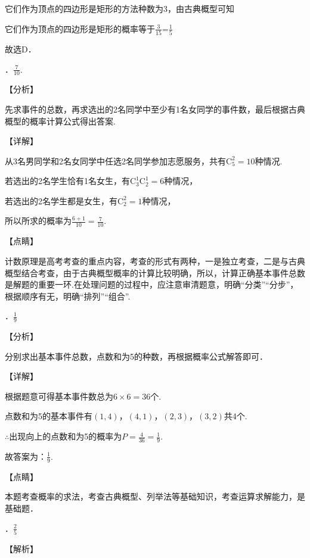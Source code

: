 \noindent 它们作为顶点的四边形是矩形的方法种数为3，由古典概型可知

\noindent 它们作为顶点的四边形是矩形的概率等于$\frac{3}{15} $=$\frac{1}{5} $

\noindent 故选D．

\noindent 

．$\frac{7}{10} $.

\noindent 【分析】

\noindent 先求事件的总数，再求选出的2名同学中至少有1名女同学的事件数，最后根据古典概型的概率计算公式得出答案.

\noindent 【详解】

\noindent 从3名男同学和2名女同学中任选2名同学参加志愿服务，共有$\mathrm C_{5}^{2} =10$种情况.

\noindent 若选出的2名学生恰有1名女生，有$\mathrm C_{3}^{1} \mathrm C_{2}^{1} =6$种情况，

\noindent 若选出的2名学生都是女生，有$\mathrm C_{2}^{2} =1$种情况，

\noindent 所以所求的概率为$\frac{6+1}{10} =\frac{7}{10} $.

\noindent 【点睛】

\noindent 计数原理是高考考查的重点内容，考查的形式有两种，一是独立考查，二是与古典概型结合考查，由于古典概型概率的计算比较明确，所以，计算正确基本事件总数是解题的重要一环.在处理问题的过程中，应注意审清题意，明确``分类''``分步''，根据顺序有无，明确``排列''``组合''.

．$\frac{1}{9} $

\noindent 【分析】

\noindent 分别求出基本事件总数，点数和为5的种数，再根据概率公式解答即可．

\noindent 【详解】

\noindent 根据题意可得基本事件数总为$6\times 6=36$个.

\noindent 点数和为5的基本事件有$\left(1,4\right)$，$\left(4,1\right)$，$\left(2,3\right)$，$\left(3,2\right)$共4个.

\noindent $\mathrm{\therefore}$出现向上的点数和为5的概率为$P=\frac{4}{36} =\frac{1}{9} $.

\noindent 故答案为：$\frac{1}{9} $.

\noindent 【点睛】

\noindent 本题考查概率的求法，考查古典概型、列举法等基础知识，考查运算求解能力，是基础题．

．$\frac{2}{5} $

\noindent 【解析】

